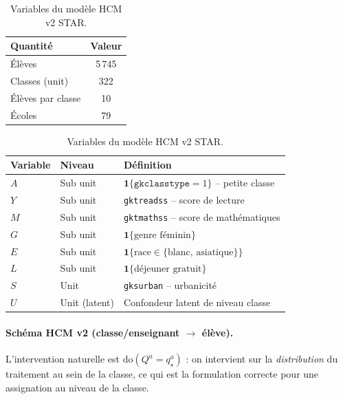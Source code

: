 \documentclass[11pt,a4paper]{article}
\newcommand{\rmdo}{\mathrm{do}}
\begin{document}
\begin{table}[!htbp]
\centering
\begin{minipage}[t]{0.42\textwidth}
\centering
\caption{Échantillon HCM v2 (cohorte maternelle).}
\label{tab:star_sample}
\begin{tabular}{lc}
\toprule
Quantité & Valeur \\
\midrule
Élèves & 5\,745 \\
Classes (unit) & 322 \\
Élèves par classe & 10 \\
Écoles & 79 \\
\bottomrule
\end{tabular}
\end{minipage}\hfill
\begin{minipage}[t]{0.56\textwidth}
\centering
\caption{Variables du modèle HCM v2 STAR.}
\label{tab:star_vars}
\begin{tabular}{llp{4.4cm}}
\toprule
Variable & Niveau & Définition \\
\midrule
$A$ & Sub unit & $\mathbf{1}\{\texttt{gkclasstype}=1\}$ -- petite classe \\
$Y$ & Sub unit & \texttt{gktreadss} -- score de lecture \\
$M$ & Sub unit & \texttt{gktmathss} -- score de mathématiques \\
$G$ & Sub unit & $\mathbf{1}\{\text{genre féminin}\}$ \\
$E$ & Sub unit & $\mathbf{1}\{\text{race} \in \{\text{blanc, asiatique}\}\}$ \\
$L$ & Sub unit & $\mathbf{1}\{\text{déjeuner gratuit}\}$ \\
$S$ & Unit & \texttt{gksurban} -- urbanicité \\
$U$ & Unit (latent) & Confondeur latent de niveau classe \\
\bottomrule
\end{tabular}
\end{minipage}
\end{table}

\paragraph{Schéma HCM v2 (classe/enseignant $\to$ élève).}

L'intervention naturelle est $\rmdo(Q^a = q^a_\star)$ : on intervient sur la \emph{distribution} du traitement au sein de la classe, ce qui est la formulation correcte pour une assignation au niveau de la classe.
\end{document}
